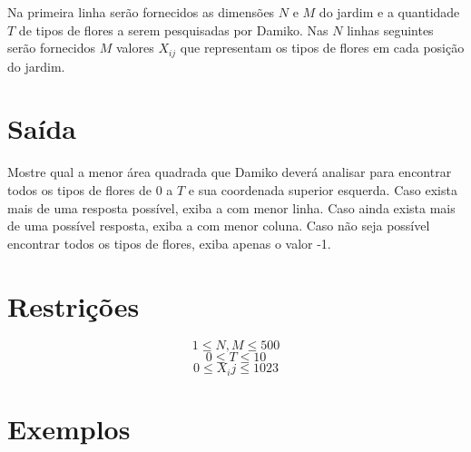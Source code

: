 \documentclass{article}
\begin{document}
Na primeira linha serão fornecidos as dimensões $N$ e $M$ do jardim e a quantidade $T$ de tipos de flores a serem pesquisadas por Damiko. Nas $N$ linhas seguintes serão fornecidos $M$ valores $X_{ij}$ que representam os tipos de flores em cada posição do jardim.

\section*{Saída}

Mostre qual a menor área quadrada que Damiko deverá analisar para encontrar todos os tipos de flores de 0 a $T$ e sua coordenada superior esquerda. Caso exista mais de uma resposta possível, exiba a com menor linha. Caso ainda exista mais de uma possível resposta, exiba a com menor coluna. Caso não seja possível encontrar todos os tipos de flores, exiba apenas o valor -1.

\section*{Restrições}

$$1 \leq N,M \leq 500$$
$$0 \leq T \leq 10$$
$$0 \leq X_ij \leq 1023$$

\section*{Exemplos}
\exemplo
\end{document}
